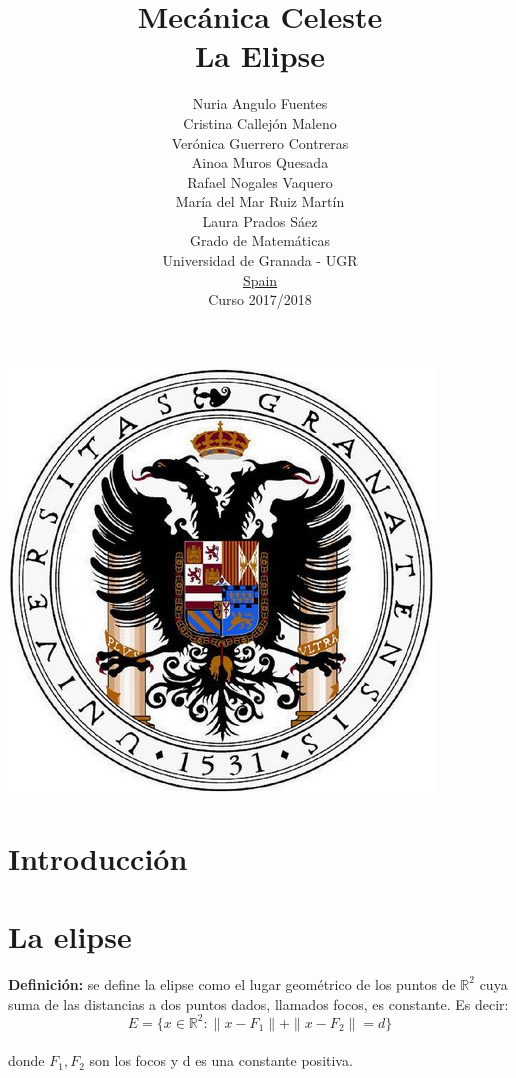 \documentclass[12pt]{article}
\title{
    Mecánica Celeste\\
    \large La Elipse
}
\author{
        Nuria Angulo Fuentes \\
        Cristina Callejón Maleno \\
        Verónica Guerrero Contreras \\
        Ainoa Muros Quesada \\
        Rafael Nogales Vaquero \\       
        María del Mar Ruiz Martín \\        
        Laura Prados Sáez \\
        Grado de Matemáticas\\
        Universidad de Granada - UGR\\
        \underline{Spain}\\
        Curso 2017/2018
        \date{}
}
\begin{document}
\maketitle
\begin{center}
\includegraphics[scale=0.45]{images/escudo.jpg}
\end{center}

\pagebreak

\section{Introducción}



\section{La elipse}


\textbf{Definición:} se define la elipse como el lugar geométrico de los puntos de $\mathbb{R}^2$ cuya suma de las distancias a dos puntos dados, llamados focos, es constante. Es decir:\\

\begin{equation} E = \{x \in \mathbb{R}^2 : \|x-F_1\| + \|x-F_2\| = d\}  \label{eq1}\end{equation}\\

donde $F_1, F_2$ son los focos y d es una constante positiva. \\
\end{document}

